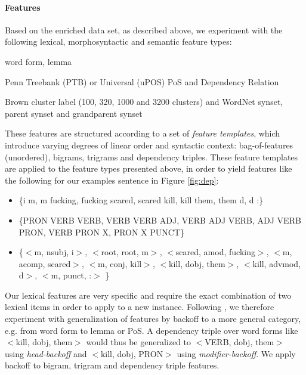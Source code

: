 \documentclass[11pt,letterpaper]{article}
\begin{document}
\paragraph{Features}
Based on the enriched data set, as described above, we experiment with the following lexical, morphosyntactic and semantic feature types:
\begin{description}
\setlength\itemsep{0em}
\item[Lexical] word form, lemma
\item[Morphosyntactic] Penn Treebank (PTB) or Universal (uPOS) PoS and Dependency Relation
\item[Semantic] Brown cluster label (100, 320, 1000 and 3200 clusters) and WordNet synset, parent synset and grandparent synset
\end{description}
These features are structured according to a set of \emph{feature
  templates}, which introduce varying degrees of linear order and
syntactic context: bag-of-features (unordered), bigrams, trigrams and
dependency triples. These feature templates are applied to the feature
types presented above, in order to yield features like the following
for our examples sentence in Figure \ref{fig:dep}:

\begin{itemize}
\setlength\itemsep{0em}
\item \{i m,  m fucking, fucking scared, scared kill, kill them,  them d,  d :\}

\item \{PRON VERB VERB, VERB VERB ADJ, VERB ADJ VERB, ADJ VERB PRON,  VERB PRON X,  PRON X PUNCT\}

\item \{$<$m, nsubj, i$>$, $<$root, root, m$>$, $<$scared, amod, fucking$>$, $<$m, acomp, scared$>$, $<$m, conj, kill$>$, $<$kill, dobj, them$>$, $<$kill, advmod, d$>$, $<$m, punct, :$>$ \}
\end{itemize}
Our lexical features are very specific and require the exact
combination of two lexical items in order to apply to a new instance.
Following , we therefore experiment with
generalization of features by backoff to a more general category,
e.g. from word form to lemma or PoS. A dependency triple over word
forms like $<$kill, dobj, them$>$ would thus be generalized to
$<$VERB, dobj, them$>$ using \emph{head-backoff} and $<$kill, dobj,
PRON$>$ using \emph{modifier-backoff}. We apply backoff to bigram,
trigram and dependency triple features.
\end{document}
